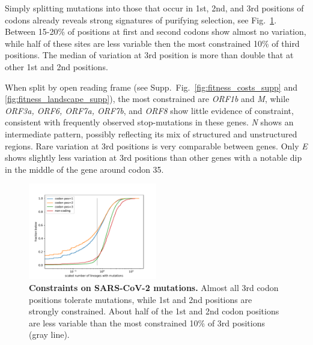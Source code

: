 \documentclass[aps,rmp, twocolumn]{revtex4}
\begin{document}
Simply splitting mutations into those that occur in 1st, 2nd, and 3rd positions of codons already reveals strong signatures of purifying selection, see Fig.~\ref{fig:fitness_costs}.
Between 15-20\% of positions at first and second codons show almost no variation, while half of these sites are less variable then the most constrained 10\% of third positions.
The median of variation at 3rd position is more than double that at other 1st and 2nd positions.

When split by open reading frame (see Supp.~Fig.~\ref{fig:fitness_costs_supp} and \ref{fig:fitness_landscape_supp}), the most constrained are \emph{ORF1b} and \emph{M}, while \emph{ORF3a, ORF6, ORF7a, ORF7b}, and \emph{ORF8} show little evidence of constraint, consistent with frequently observed stop-mutations in these genes.
\emph{N} shows an intermediate pattern, possibly reflecting its mix of structured and unstructured regions.
Rare variation at 3rd positions is very comparable between genes.
Only \emph{E} shows slightly less variation at 3rd positions than other genes with a notable dip in the middle of the gene around codon 35.



\begin{figure}
    \includegraphics[width=0.5\textwidth]{figures/fitness_cost.pdf}
    \caption{{\bf Constraints on SARS-CoV-2 mutations.}
    Almost all 3rd codon positions tolerate mutations, while 1st and 2nd positions are strongly constrained.
    About half of the 1st and 2nd codon positions are less variable than the most constrained 10\% of 3rd positions (gray line).
    \label{fig:fitness_costs}}
 \end{figure}
\end{document}

